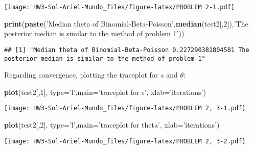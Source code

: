 \documentclass[
]{article}
\newenvironment{Shaded}{\begin{snugshade}}{\end{snugshade}}
\newcommand{\DataTypeTok}[1]{\textcolor[rgb]{0.13,0.29,0.53}{#1}}
\newcommand{\DecValTok}[1]{\textcolor[rgb]{0.00,0.00,0.81}{#1}}
\newcommand{\KeywordTok}[1]{\textcolor[rgb]{0.13,0.29,0.53}{\textbf{#1}}}
\newcommand{\NormalTok}[1]{#1}
\newcommand{\StringTok}[1]{\textcolor[rgb]{0.31,0.60,0.02}{#1}}
\begin{document}
\texttt{[image: HW3-Sol-Ariel-Mundo\_files/figure-latex/PROBLEM 2-1.pdf]}

\begin{Shaded}
\begin{Highlighting}[]
\KeywordTok{print}\NormalTok{(}\KeywordTok{paste}\NormalTok{(}\StringTok{'Median theta of Binomial-Beta-Poisson'}\NormalTok{,}\KeywordTok{median}\NormalTok{(test2[,}\DecValTok{2}\NormalTok{]),}\StringTok{'The posterior median is similar to the method of problem 1'}\NormalTok{))}
\end{Highlighting}
\end{Shaded}

\begin{verbatim}
## [1] "Median theta of Binomial-Beta-Poisson 0.227290381804581 The posterior median is similar to the method of problem 1"
\end{verbatim}

Regarding convergence, plotting the traceplot for \(s\) and \(\theta\):

\begin{Shaded}
\begin{Highlighting}[]
\KeywordTok{plot}\NormalTok{(test2[,}\DecValTok{1}\NormalTok{], }\DataTypeTok{type=}\StringTok{'l'}\NormalTok{,}\DataTypeTok{main=}\StringTok{'traceplot for s'}\NormalTok{, }\DataTypeTok{xlab=}\StringTok{'iterations'}\NormalTok{)}
\end{Highlighting}
\end{Shaded}

\texttt{[image: HW3-Sol-Ariel-Mundo\_files/figure-latex/PROBLEM 2, 3-1.pdf]}

\begin{Shaded}
\begin{Highlighting}[]
\KeywordTok{plot}\NormalTok{(test2[,}\DecValTok{2}\NormalTok{], }\DataTypeTok{type=}\StringTok{'l'}\NormalTok{,}\DataTypeTok{main=}\StringTok{'traceplot for theta'}\NormalTok{, }\DataTypeTok{xlab=}\StringTok{'iterations'}\NormalTok{)}
\end{Highlighting}
\end{Shaded}

\texttt{[image: HW3-Sol-Ariel-Mundo\_files/figure-latex/PROBLEM 2, 3-2.pdf]}
\end{document}
